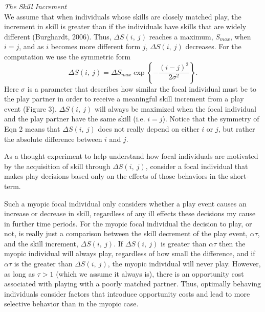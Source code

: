 \documentclass[12pt, letterpaper, fleqn]{article}
\begin{document}
	\noindent \textit{The Skill Increment}\\
	We assume that when individuals whose skills are closely matched play, the increment in skill is greater than if the individuals have skills that are widely different (Burghardt, 2006).
	Thus, $\Delta S(i,~j)$ reaches a maximum,  $S_{max}$, when $i=j$, and as $i$ becomes more different form $j$, $\Delta S(i,~j)$ decreases.
	For the computation we use the symmetric form  
	\begin{equation}
	\Delta S(i,~j) = \Delta S_{max} \exp\left\{ -  \frac{(i-j)^2}{2\sigma^2}     \right\}.
	\label{sdf}
	\end{equation}   
	Here $\sigma$ is a parameter that describes how similar the focal individual must be to the play partner in order to receive a meaningful skill increment from a play event (Figure 3).
	$\Delta S(i,~j)$ will always be maximized when the focal individual and the play partner have the same skill (i.e. $i = j$).    
	Notice that the symmetry of Eqn 2 means that $\Delta S(i,~j)$ does not really depend on either $i$ or $j$, but rather the absolute difference between $i$ and $j$.    
	
	
	As a thought experiment to help understand how focal individuals are motivated by the acquisition of skill through $\Delta S(i,~j)$, consider a focal individual that makes play decisions based only on the effects of those behaviors in the short-term.
	
	
	Such a myopic focal individual only considers whether a play event  causes an increase or decrease in skill, regardless of any ill effects these decisions my cause in further time periods. 
	For the myopic focal individual the decision to play, or not, is really just a comparison between the skill decrement of the play event, $\alpha \tau$, and the skill increment, $\Delta S(i,~j)$.
	If $\Delta S(i,~j)$ is greater than $\alpha \tau$ then the myopic individual will always play, regardless of how small the difference, and if $\alpha \tau$ is the greater than $\Delta S(i,~j)$, the myopic individual will never play.   
	However, as long as $\tau>1$ (which we assume it always is), there is an opportunity cost associated with playing with a poorly matched partner. %
	Thus, optimally behaving individuals consider factors that introduce opportunity costs and lead to more selective behavior than in the myopic case. \\   
	
\end{document}
